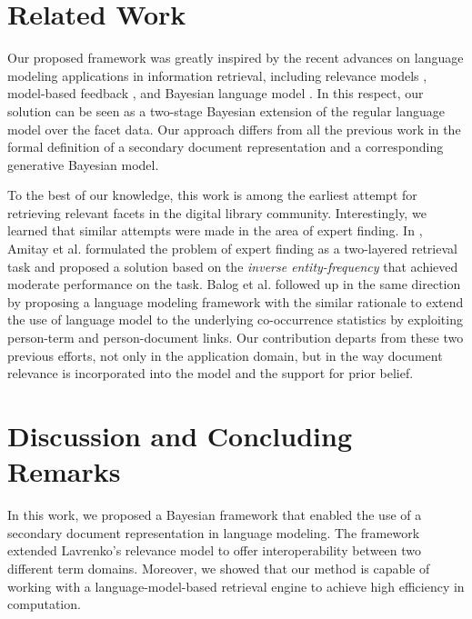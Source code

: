 \section{Related Work}\label{s:related-work}

Our proposed framework was greatly inspired by the recent advances on language
modeling applications in information retrieval, including relevance models
\cite{lavrenko2001relevance,lavrenko2002cross-lingual}, model-based feedback
\cite{zhai2001language}, and Bayesian language model
\cite{zaragorza2003bayesian}.  In this respect, our solution can be seen as a
two-stage Bayesian extension of the regular language model over the facet data.
Our approach differs from all the previous work in the formal definition of a
secondary document representation and a corresponding generative Bayesian
model.  

To the best of our knowledge, this work is among the earliest attempt for
retrieving relevant facets in the digital library community.  Interestingly, we
learned that similar attempts were made in the area of expert finding.  In
\cite{amitay2008finding}, Amitay et al. formulated the problem of expert
finding as a two-layered retrieval task and proposed a solution based on the
\emph{inverse entity-frequency} that achieved moderate performance on the task.
Balog et al. \cite{balog2009language} followed up in the same direction by
proposing a language modeling framework with the similar rationale to extend
the use of language model to the underlying co-occurrence statistics by
exploiting person-term and person-document links.  Our contribution departs
from these two previous efforts, not only in the application domain, but in the
way document relevance is incorporated into the model and the support for prior
belief.  
 
\section{Discussion and Concluding Remarks}\label{s:concluding-remarks}

In this work, we proposed a Bayesian framework that enabled the use of a
secondary document representation in language modeling.  The framework extended
Lavrenko's relevance model to offer interoperability between two different
term domains.  Moreover, we showed that our method is capable of working with a
language-model-based retrieval engine to achieve high efficiency in
computation.  

